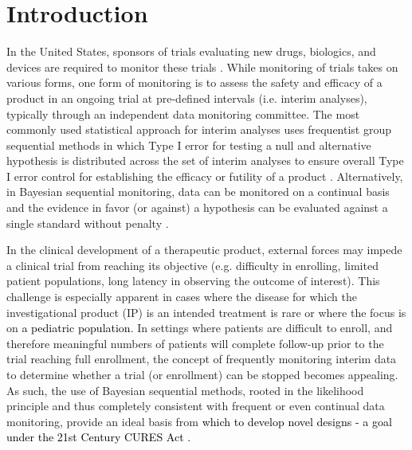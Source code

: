 \documentclass[12pt]{article}
\begin{document}
\section{Introduction}

In the United States, sponsors of trials evaluating new drugs, biologics, and devices are required to monitor these trials \citep{FDA2006}. 
%
While monitoring of trials takes on various forms, one form of monitoring is to assess the safety and efficacy of a product in an ongoing trial at pre-defined intervals (i.e. interim analyses), typically through an independent data monitoring committee. 
%
The most commonly used statistical approach for interim analyses uses frequentist group sequential methods in which Type I error for testing a null and alternative hypothesis is distributed across the set of interim analyses to ensure overall Type I error control for establishing the efficacy or futility of a product \citep{Jennison2000}.  
%
Alternatively, in Bayesian sequential monitoring, data can be monitored on a continual basis and the evidence in favor (or against) a hypothesis can be evaluated against a single standard without penalty \citep{Spiegelhalter1993}. %

In the clinical development of a therapeutic product, external forces may impede a clinical trial from reaching its objective (e.g. difficulty in enrolling, limited patient populations, long latency in observing the outcome of interest). 
%
This challenge is especially apparent in cases where the disease for which the investigational product (IP) is an intended treatment is rare or where the focus is on \textcolor{black}{a pediatric population}. 
%
In settings where patients are difficult to enroll, and therefore meaningful numbers of patients will complete follow-up prior to the trial reaching full enrollment, the concept of frequently monitoring interim data to determine whether a trial (or enrollment) can be stopped becomes appealing. 
%
As such, the use of Bayesian sequential methods, rooted in the likelihood principle and thus completely consistent with frequent or even continual data monitoring, provide an ideal basis from \textcolor{black}{which to develop novel designs - a goal under the 21st Century CURES Act \citep{USCongress2016}.}
%
\end{document}

